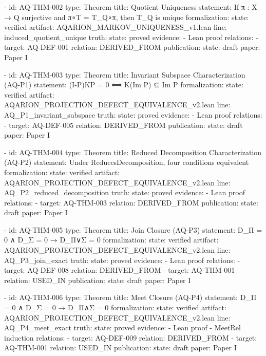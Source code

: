   - id: AQ-THM-002
    type: Theorem
    title: Quotient Uniqueness
    statement: If π : X → Q surjective and π∘T = T_Q∘π, then T_Q is unique
    formalization:
      state: verified
      artifact: AQARION_MARKOV_UNIQUENESS_v1.lean
      line: induced_quotient_unique
    truth:
      state: proved
    evidence:
      - Lean proof
    relations:
      - target: AQ-DEF-001
        relation: DERIVED_FROM
    publication:
      state: draft
      paper: Paper I

  - id: AQ-THM-003
    type: Theorem
    title: Invariant Subspace Characterization (AQ-P1)
    statement: (I-P)KP = 0 ⟺ K(Im P) ⊆ Im P
    formalization:
      state: verified
      artifact: AQARION_PROJECTION_DEFECT_EQUIVALENCE_v2.lean
      line: AQ_P1_invariant_subspace
    truth:
      state: proved
    evidence:
      - Lean proof
    relations:
      - target: AQ-DEF-005
        relation: DERIVED_FROM
    publication:
      state: draft
      paper: Paper I

  - id: AQ-THM-004
    type: Theorem
    title: Reduced Decomposition Characterization (AQ-P2)
    statement: Under ReducesDecomposition, four conditions equivalent
    formalization:
      state: verified
      artifact: AQARION_PROJECTION_DEFECT_EQUIVALENCE_v2.lean
      line: AQ_P2_reduced_decomposition
    truth:
      state: proved
    evidence:
      - Lean proof
    relations:
      - target: AQ-THM-003
        relation: DERIVED_FROM
    publication:
      state: draft
      paper: Paper I

  - id: AQ-THM-005
    type: Theorem
    title: Join Closure (AQ-P3)
    statement: D_Π = 0 ∧ D_Σ = 0 → D_{Π∨Σ} = 0
    formalization:
      state: verified
      artifact: AQARION_PROJECTION_DEFECT_EQUIVALENCE_v2.lean
      line: AQ_P3_join_exact
    truth:
      state: proved
    evidence:
      - Lean proof
    relations:
      - target: AQ-DEF-008
        relation: DERIVED_FROM
      - target: AQ-THM-001
        relation: USED_IN
    publication:
      state: draft
      paper: Paper I

  - id: AQ-THM-006
    type: Theorem
    title: Meet Closure (AQ-P4)
    statement: D_Π = 0 ∧ D_Σ = 0 → D_{Π∧Σ} = 0
    formalization:
      state: verified
      artifact: AQARION_PROJECTION_DEFECT_EQUIVALENCE_v2.lean
      line: AQ_P4_meet_exact
    truth:
      state: proved
    evidence:
      - Lean proof
      - MeetRel induction
    relations:
      - target: AQ-DEF-009
        relation: DERIVED_FROM
      - target: AQ-THM-001
        relation: USED_IN
    publication:
      state: draft
      paper: Paper I

